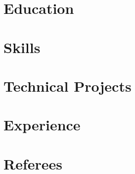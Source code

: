 \documentclass[letter,10pt]{article}
\begin{document}


\section{\textbf{Education}}


\section{\textbf{Skills}}


\section{\textbf{Technical Projects}}


\section{\textbf{Experience}}






\section{\textbf{Referees}}

\end{document}
